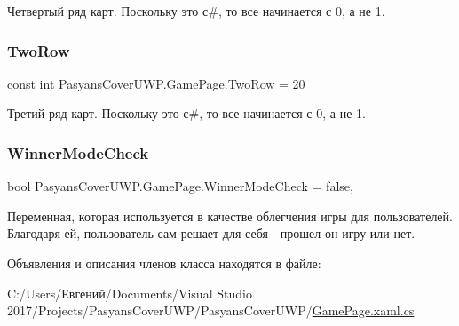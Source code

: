 Четвертый ряд карт. Поскольку это с\#, то все начинается с 0, а не 1. 

\mbox{\label{class_pasyans_cover_u_w_p_1_1_game_page_a815d76a3c2a50ae107f10275e2574285}} 
\subsubsection{\texorpdfstring{Two\+Row}{TwoRow}}
{\footnotesize\ttfamily const int Pasyans\+Cover\+U\+W\+P.\+Game\+Page.\+Two\+Row = 20\hspace{0.3cm}{\ttfamily [private]}}



Третий ряд карт. Поскольку это с\#, то все начинается с 0, а не 1. 

\mbox{\label{class_pasyans_cover_u_w_p_1_1_game_page_a2bf9a3300a4ab635aeb61d6cf6c2ee13}} 
\subsubsection{\texorpdfstring{Winner\+Mode\+Check}{WinnerModeCheck}}
{\footnotesize\ttfamily bool Pasyans\+Cover\+U\+W\+P.\+Game\+Page.\+Winner\+Mode\+Check = false\hspace{0.3cm}{\ttfamily [static]}, {\ttfamily [private]}}



Переменная, которая используется в качестве облегчения игры для пользователей. Благодаря ей, пользователь сам решает для себя -\/ прошел он игру или нет. 



Объявления и описания членов класса находятся в файле\+:\begin{DoxyCompactItemize}
\item 
C\+:/\+Users/Евгений/\+Documents/\+Visual Studio 2017/\+Projects/\+Pasyans\+Cover\+U\+W\+P/\+Pasyans\+Cover\+U\+W\+P/\hyperlink{_game_page_8xaml_8cs}{Game\+Page.\+xaml.\+cs}\end{DoxyCompactItemize}

